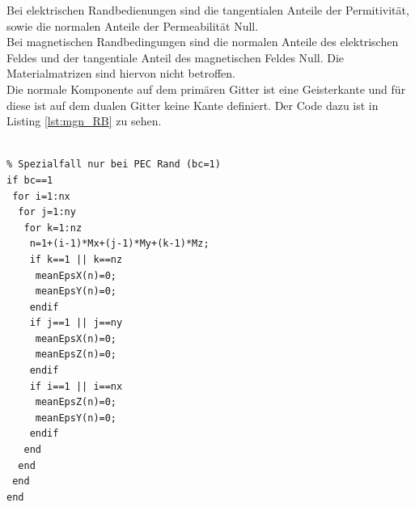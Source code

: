 \documentclass[Protokollheft.tex]{subfiles}
\begin{document}
Bei elektrischen Randbedienungen sind die tangentialen Anteile der Permitivität, sowie die normalen Anteile der Permeabilität Null.\\
Bei magnetischen Randbedingungen sind die normalen Anteile des elektrischen Feldes und der tangentiale Anteil des magnetischen Feldes Null. 
Die Materialmatrizen sind hiervon nicht betroffen. \\
Die normale Komponente auf dem primären Gitter ist eine Geisterkante und für diese ist auf dem dualen Gitter keine Kante definiert. Der Code dazu ist in Listing \ref{lst:mgn_RB} zu sehen.
\begin{lstlisting}[caption={Einsetzen der elektrischen Randbedigungen},label={lst:mgn_RB}]
%% Randbedingungen

% Spezialfall nur bei PEC Rand (bc=1)
if bc==1
 for i=1:nx
  for j=1:ny
   for k=1:nz
    n=1+(i-1)*Mx+(j-1)*My+(k-1)*Mz;
    if k==1 || k==nz
     meanEpsX(n)=0; 
     meanEpsY(n)=0;
    endif
    if j==1 || j==ny
     meanEpsX(n)=0; 
     meanEpsZ(n)=0;
    endif
    if i==1 || i==nx
     meanEpsZ(n)=0; 
     meanEpsY(n)=0;
    endif
   end
  end
 end
end
\end{lstlisting}
\end{document}
